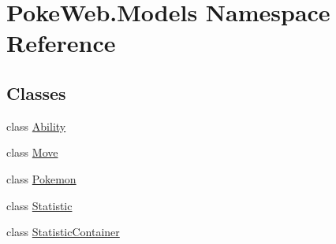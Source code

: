 \hypertarget{namespace_poke_web_1_1_models}{}\section{Poke\+Web.\+Models Namespace Reference}
\label{namespace_poke_web_1_1_models}
\subsection*{Classes}
\begin{DoxyCompactItemize}
\item 
class \mbox{\hyperlink{class_poke_web_1_1_models_1_1_ability}{Ability}}
\item 
class \mbox{\hyperlink{class_poke_web_1_1_models_1_1_move}{Move}}
\item 
class \mbox{\hyperlink{class_poke_web_1_1_models_1_1_pokemon}{Pokemon}}
\item 
class \mbox{\hyperlink{class_poke_web_1_1_models_1_1_statistic}{Statistic}}
\item 
class \mbox{\hyperlink{class_poke_web_1_1_models_1_1_statistic_container}{Statistic\+Container}}
\end{DoxyCompactItemize}
